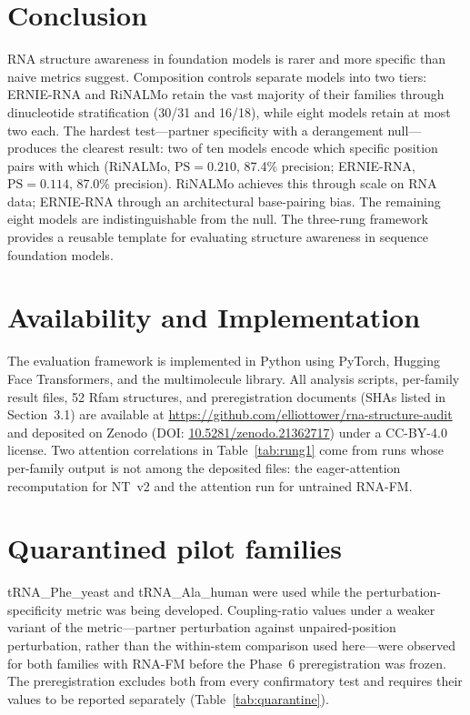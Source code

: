 \documentclass[11pt]{article}
\begin{document}
\section{Conclusion}

RNA structure awareness in foundation models is rarer and more
specific than naive metrics suggest. Composition controls separate
models into two tiers: ERNIE-RNA and RiNALMo retain the vast majority
of their families through dinucleotide stratification (30/31 and
16/18), while eight models retain at most two each. The hardest
test---partner specificity with a derangement null---produces the
clearest result: two of ten models encode which specific position
pairs with which (RiNALMo, $\text{PS} = 0.210$, 87.4\% precision;
ERNIE-RNA, $\text{PS} = 0.114$, 87.0\% precision). RiNALMo achieves
this through scale on RNA data; ERNIE-RNA through an architectural
base-pairing bias. The remaining eight models are indistinguishable
from the null. The three-rung framework provides a reusable template
for evaluating structure awareness in sequence foundation models.


\section*{Availability and Implementation}

The evaluation framework is implemented in Python using PyTorch,
Hugging Face Transformers, and the multimolecule library. All analysis
scripts, per-family result files, 52 Rfam structures, and
preregistration documents (SHAs listed in Section~3.1) are available at
\url{https://github.com/elliottower/rna-structure-audit} and
deposited on Zenodo (DOI:
\href{https://doi.org/10.5281/zenodo.21362717}{10.5281/zenodo.21362717})
under a CC-BY-4.0 license. Two attention correlations in
Table~\ref{tab:rung1} come from runs whose per-family output is not
among the deposited files: the eager-attention recomputation for
NT~v2 and the attention run for untrained RNA-FM.

\appendix

\section{Quarantined pilot families}
\label{app:quarantine}

tRNA\_Phe\_yeast and tRNA\_Ala\_human were used while the
perturbation-specificity metric was being developed. Coupling-ratio values
under a weaker variant of the metric---partner perturbation against
unpaired-position perturbation, rather than the within-stem comparison used
here---were observed for both families with RNA-FM before the Phase~6
preregistration was frozen. The preregistration excludes both from every
confirmatory test and requires their values to be reported separately
(Table~\ref{tab:quarantine}).
\end{document}
